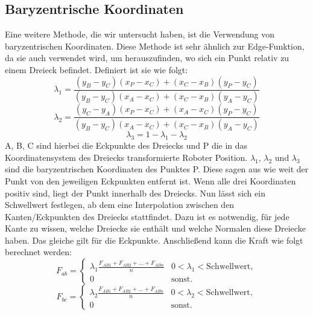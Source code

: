 \documentclass[conference]{IEEEtran}
\begin{document}
\subsection{Baryzentrische Koordinaten}
Eine weitere Methode, die wir untersucht haben, ist die Verwendung von baryzentrischen Koordinaten. 
Diese Methode ist sehr ähnlich zur Edge-Funktion, da sie auch verwendet wird, um herauszufinden, 
wo sich ein Punkt relativ zu einem Dreieck befindet. Definiert ist sie wie folgt:
\begin{equation*}
    \lambda_1 = \frac{(y_{B} - y_{C})(x_{P} - x_{C}) + (x_{C} - x_{B})(y_{P} - y_{C})}{(y_{B} - y_{C})(x_{A} - x_{C}) + (x_{C} - x_{B})(y_{A} - y_{C})}
\end{equation*}
\begin{equation}
    \lambda_2 = \frac{(y_{C} - y_{A})(x_{P} - x_{C}) + (x_{A} - x_{C})(y_{P} - y_{C})}{(y_{B} - y_{C})(x_{A} - x_{C}) + (x_{C} - x_{B})(y_{A} - y_{C})}
\end{equation}
\begin{equation*}
    \lambda_3 = 1 - \lambda_1 - \lambda_2
\end{equation*}
A, B, C sind hierbei die Eckpunkte des Dreiecks und P die in das Koordinatensystem des Dreiecks 
transformierte Roboter Position. $\lambda_1$, $\lambda_2$ und $\lambda_3$ sind die baryzentrischen 
Koordinaten des Punktes P. Diese sagen aus wie weit der Punkt von den jeweiligen Eckpunkten entfernt ist. 
Wenn alle drei Koordinaten positiv sind, liegt der Punkt innerhalb des Dreiecks. Nun lässt sich ein 
Schwellwert festlegen, ab dem eine Interpolation zwischen den Kanten/Eckpunkten des Dreiecks stattfindet. 
Dazu ist es notwendig, für jede Kante zu wissen, welche Dreiecke sie enthält und welche Normalen diese 
Dreiecke haben. Das gleiche gilt für die Eckpunkte. Anschließend kann die Kraft wie folgt 
berechnet werden:
\begin{equation*}
    F_{ab} = 
    \begin{cases} 
        \lambda_1 \frac{{ F_{AB1} + F_{AB2} + \ldots + F_{ABn}}}{n} &  0 < \lambda_1 < \text{Schwellwert}, \\
        0 & \text{sonst.}
    \end{cases}
\end{equation*}
\begin{equation*}
    F_{bc} =
    \begin{cases} 
        \lambda_2 \frac{{ F_{AB1} + F_{AB2} + \ldots + F_{ABn}}}{n} &  0 < \lambda_2 < \text{Schwellwert}, \\
        0 & \text{sonst.}
    \end{cases}
\end{equation*}
\end{document}
